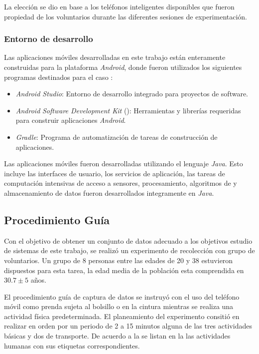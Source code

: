 La elección se dio en base a los teléfonos inteligentes disponibles
que fueron propiedad de los voluntarios durante las diferentes sesiones
de experimentación.

\subsubsection{Entorno de desarrollo }

Las aplicaciones móviles desarrolladas en este trabajo están enteramente
construidas para la plataforma \emph{Android}, donde fueron utilizados
los siguientes programas destinados para el caso \cite{Android2016}:
\begin{itemize}
\item \emph{Android Studio}: Entorno de desarrollo integrado para proyectos\emph{
}de software.
\item \emph{Android} \emph{Software Development Kit }(): Herramientas
y librerías  requeridas para construir aplicaciones \emph{Android}.
\item \emph{Gradle}: Programa de automatización de tareas de construcción
de aplicaciones.
\end{itemize}
Las aplicaciones móviles fueron desarrolladas utilizando el lenguaje
\emph{Java}. Esto incluye las interfaces de usuario, los servicios
de aplicación, las tareas de computación intensivas de acceso a sensores,
procesamiento, algoritmos de  y almacenamiento de datos
fueron desarrollados integramente en \emph{Java}.

\subsection{Procedimiento Guía }

Con el objetivo de obtener un conjunto de datos adecuado a los objetivos
estudio de sistemas  de este trabajo, se realizó un experimento
de recolección con grupo de voluntarios. Un grupo de 8 personas entre
las edades de 20 y 38 estuvieron dispuestos para esta tarea, la edad
media de la población esta comprendida en $30.7\pm5$ años. 

El procedimiento guía de captura de datos se instruyó con el uso del
teléfono móvil como prenda sujeta al bolsillo o en la cintura mientras
se realiza una actividad física predeterminada. El planeamiento del
experimento consitió en realizar en orden por un periodo de 2 a 15
minutos alguna de las tres actividades básicas y dos de transporte.
De acuerdo a la  se listan en la 
las actividades humanas con sus etiquetas correspondientes.

